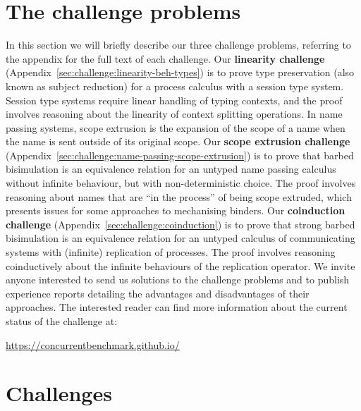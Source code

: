 \documentclass[runningheads]{llncs}
\begin{document}
\section{The challenge problems}
In this section we will briefly describe our three challenge problems, referring to the appendix for the full text of each challenge.
Our \textbf{linearity challenge} (Appendix~\ref{sec:challenge:linearity-beh-types}) is to prove type preservation (also known as subject reduction) for a process calculus with a session type system.
Session type systems require linear handling of typing contexts, and the proof involves reasoning about the linearity of context splitting operations.
In name passing systems, scope extrusion is the expansion of the scope of a name when the name is sent outside of its original scope.
Our \textbf{scope extrusion challenge} (Appendix~\ref{sec:challenge:name-passing-scope-extrusion}) is to prove that barbed bisimulation is an equivalence relation for an untyped name passing calculus without infinite behaviour, but with non-deterministic choice.
The proof involves reasoning about names that are ``in the process'' of being scope extruded, which presents issues for some approaches to mechanising binders.
Our \textbf{coinduction challenge} (Appendix~\ref{sec:challenge:coinduction}) is to prove that strong barbed bisimulation is an equivalence relation for an untyped calculus of communicating systems with (infinite) replication of processes.
The proof involves reasoning coinductively about the infinite behaviours of the replication operator.
We invite anyone interested to send us solutions to the challenge problems and to publish experience reports detailing the advantages and disadvantages of their approaches.
The interested reader can find more information about the current status of the challenge at:
\begin{center}
  \url{https://concurrentbenchmark.github.io/}
\end{center}




\appendix
\section{Challenges}

\end{document}
